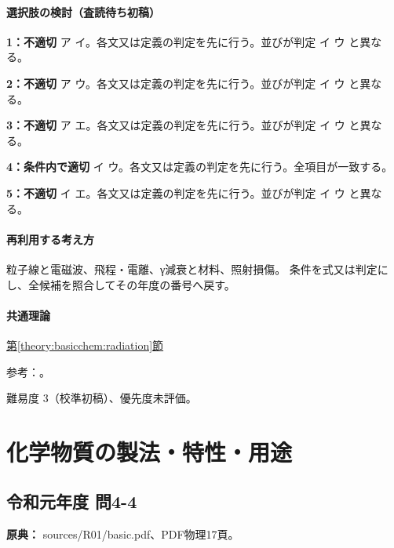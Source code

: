 \paragraph{選択肢の検討（査読待ち初稿）}\mbox{}\par

\noindent\textbf{1：不適切} ア イ。各文又は定義の判定を先に行う。並びが判定 イ ウ と異なる。\par

\noindent\textbf{2：不適切} ア ウ。各文又は定義の判定を先に行う。並びが判定 イ ウ と異なる。\par

\noindent\textbf{3：不適切} ア エ。各文又は定義の判定を先に行う。並びが判定 イ ウ と異なる。\par

\noindent\textbf{4：条件内で適切} イ ウ。各文又は定義の判定を先に行う。全項目が一致する。\par

\noindent\textbf{5：不適切} イ エ。各文又は定義の判定を先に行う。並びが判定 イ ウ と異なる。\par

\paragraph{再利用する考え方} 粒子線と電磁波、飛程・電離、γ減衰と材料、照射損傷。 条件を式又は判定にし、全候補を照合してその年度の番号へ戻す。

\paragraph{共通理論} \hyperref[theory:basicchem:radiation]{第\ref*{theory:basicchem:radiation}節}

\par 参考：\cite{finish56_radiation}。

\par 難易度 3（校準初稿）、優先度未評価。

\section{化学物質の製法・特性・用途}

\subsection{令和元年度 問4-4}
\label{q:r01-reg-basic-4-4}

\noindent\textbf{原典：} sources/R01/basic.pdf、PDF物理17頁。

